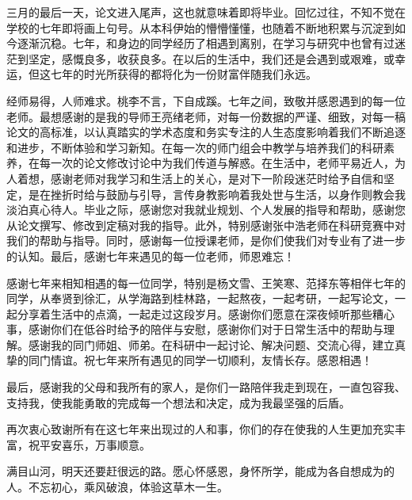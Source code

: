 \documentclass{shnuthesis}
\begin{document}
\begin{thankpage}
\setlength{\baselineskip}{24pt}
	
三月的最后一天，论文进入尾声，这也就意味着即将毕业。回忆过往，不知不觉在学校的七年即将画上句号。从本科伊始的懵懵懂懂，也随着不断地积累与沉淀到如今逐渐沉稳。七年，和身边的同学经历了相遇到离别，在学习与研究中也曾有过迷茫到坚定，感慨良多，收获良多。在以后的生活中，我们还是会遇到或艰难，或幸运，但这七年的时光所获得的都将化为一份财富伴随我们永远。

经师易得，人师难求。桃李不言，下自成蹊。七年之间，致敬并感恩遇到的每一位老师。最想感谢的是我的导师王亮绪老师，对每一份数据的严谨、细致，对每一稿论文的高标准，以认真踏实的学术态度和务实专注的人生态度影响着我们不断追逐和进步，不断体验和学习新知。在每一次的师门组会中教学与培养我们的科研素养，在每一次的论文修改讨论中为我们传道与解惑。在生活中，老师平易近人，为人着想，感谢老师对我学习和生活上的关心，是对下一阶段迷茫时给予自信和坚定，是在挫折时给与鼓励与引导，言传身教影响着我处世与生活，以身作则教会我淡泊真心待人。毕业之际，感谢您对我就业规划、个人发展的指导和帮助，感谢您从论文撰写、修改到定稿对我的指导。此外，特别感谢张中浩老师在科研竞赛中对我们的帮助与指导。同时，感谢每一位授课老师，是你们使我们对专业有了进一步的认知。最后，感谢七年来遇见的每一位老师，师恩难忘！

感谢七年来相知相遇的每一位同学，特别是杨文雪、王笑寒、范择东等相伴七年的同学，从奉贤到徐汇，从学海路到桂林路，一起熬夜，一起考研，一起写论文，一起分享着生活中的点滴，一起走过这段岁月。感谢你们愿意在深夜倾听那些糟心事，感谢你们在低谷时给予的陪伴与安慰，感谢你们对于日常生活中的帮助与理解。感谢我的同门师姐、师弟。在科研中一起讨论、解决问题、交流心得，建立真挚的同门情谊。祝七年来所有遇见的同学一切顺利，友情长存。感恩相遇！

最后，感谢我的父母和我所有的家人，是你们一路陪伴我走到现在，一直包容我、支持我，使我能勇敢的完成每一个想法和决定，成为我最坚强的后盾。

再次衷心致谢所有在这七年来出现过的人和事，你们的存在使我的人生更加充实丰富，祝平安喜乐，万事顺意。

满目山河，明天还要赶很远的路。愿心怀感恩，身怀所学，能成为各自想成为的人。不忘初心，乘风破浪，体验这草木一生。

	
\end{thankpage}

\end{document}
